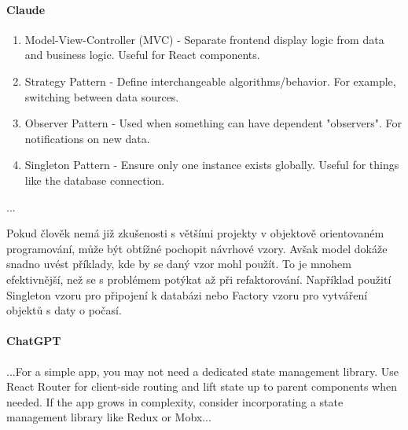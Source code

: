 \documentclass[FM,DP]{tulthesis}
\begin{document}
		\vspace{0.6em}
		\begin{tcolorbox}[colback=white,colframe=black]
			\paragraph{Claude}
			\begin{enumerate}
				\item Model-View-Controller (MVC) - Separate frontend display logic from data and business logic. Useful for React components.
				
				\item Strategy Pattern - Define interchangeable algorithms/behavior. For example, switching between data sources.
				
				\item Observer Pattern - Used when something can have dependent "observers". For notifications on new data.
				
				\item Singleton Pattern - Ensure only one instance exists globally. Useful for things like the database connection.
			\end{enumerate}
			...\cite{claude_navrh}
		\end{tcolorbox}
		\vspace{0.6em} 
		
		Pokud člověk nemá již zkušenosti s většími projekty v objektově orientovaném programování, může být obtížné pochopit návrhové vzory. Avšak model dokáže snadno uvést příklady, kde by se daný vzor mohl použít. To je mnohem efektivnější, než se s problémem potýkat až při refaktorování. Například použití Singleton vzoru pro připojení k databázi nebo Factory vzoru pro vytváření objektů s daty o počasí.
		
		\vspace{0.6em}
		\begin{tcolorbox}[colback=white,colframe=black]
			\paragraph{ChatGPT}
			...For a simple app, you may not need a dedicated state management library. Use React Router for client-side routing and lift state up to parent components when needed. If the app grows in complexity, consider incorporating a state management library like Redux or Mobx... \cite{chatgpt_navrh}
		\end{tcolorbox}
		\vspace{0.6em}
		
\end{document}

